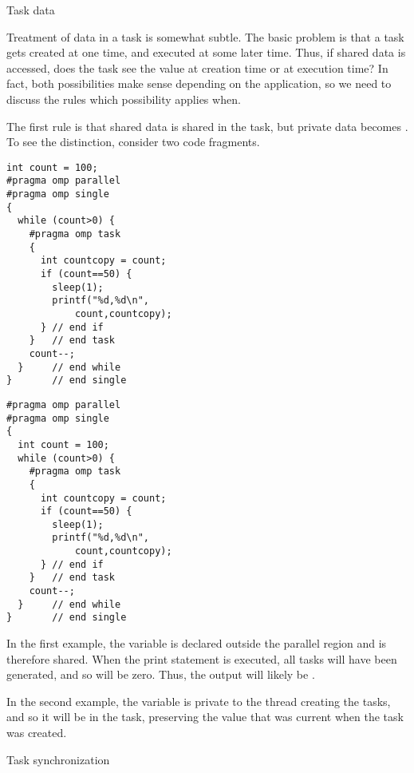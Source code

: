 {Task data}

Treatment of data in a task is somewhat subtle. The basic problem is
that a task gets created at one time, and executed at some later time.
Thus,
if shared data is accessed, does the task see the value at creation
time or at execution time? In fact, both possibilities make sense
depending on the application, so we need to discuss the rules 
which possibility applies when.

The first rule is that shared data is shared in the task, but private
data becomes . To see the distinction, consider two
code fragments.

\begin{multicols}{2}
\begin{lstlisting}
int count = 100;
#pragma omp parallel
#pragma omp single
{
  while (count>0) {
    #pragma omp task
    {
      int countcopy = count;
      if (count==50) {
        sleep(1);
        printf("%d,%d\n",
            count,countcopy);
      } // end if
    }   // end task
    count--;
  }     // end while
}       // end single
\end{lstlisting}

\columnbreak

\begin{lstlisting}
#pragma omp parallel
#pragma omp single
{
  int count = 100;
  while (count>0) {
    #pragma omp task
    {
      int countcopy = count;
      if (count==50) {
        sleep(1);
        printf("%d,%d\n",
            count,countcopy);
      } // end if
    }   // end task
    count--;
  }     // end while
}       // end single
\end{lstlisting}

\end{multicols}

In the first example,
the variable  is declared outside the
parallel region and is therefore shared. When the print statement is
executed, all tasks will have been generated, and so  will be
zero. Thus, the output will likely be .

In the second example,
the  variable is private to the thread creating the tasks,
and so it will be  in the task, preserving the value
that was current when the task was created.


 {Task synchronization}

